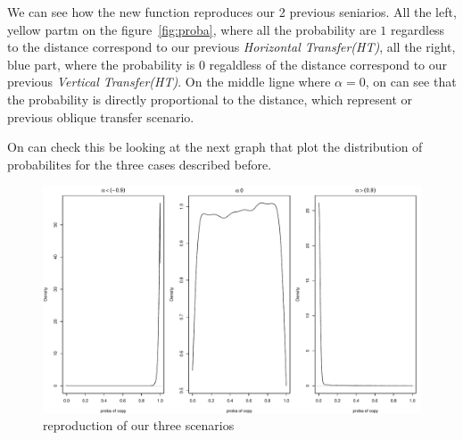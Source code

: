 \documentclass{article}
\begin{document}
We can see how the new function reproduces our 2 previous seniarios. All the left, yellow partm on the figure~\ref{fig:proba}, where all the probability are $1$ regardless to the distance correspond to our previous \emph{Horizontal Transfer(HT)}, all the right, blue part, where the probability is $0$ regaldless of the distance correspond to our previous \emph{Vertical Transfer(HT)}. On the middle ligne where $\alpha=0$, on can see that the probability is directly proportional to the distance, which represent or previous oblique transfer scenario. 

On can check this be looking at the next graph that plot the distribution of probabilites for the three cases described before.
\begin{figure}[h]
    \centering
    \includegraphics[width=.6\textwidth]{distribution_proba.pdf}
    \caption{reproduction of our three scenarios}
    \label{fig:thrreprob}
\end{figure}
\end{document}
